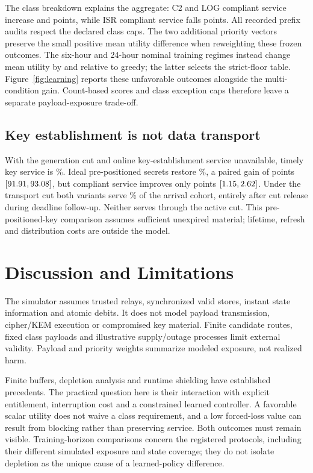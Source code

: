 \documentclass[conference,a4paper]{IEEEtran}
\begin{document}
The class breakdown explains the aggregate: C2 and LOG compliant service increase \LearnCommandDelta{} and \LearnLogisticsDelta{} points, while ISR compliant service falls \LearnISRLoss{} points. All recorded prefix audits respect the declared class caps. The two additional priority vectors preserve the small positive mean utility difference when reweighting these frozen outcomes. The six-hour and 24-hour nominal training regimes instead change mean utility by \LearnShortDelta{} and \LearnLongDelta{} relative to greedy; the latter selects the strict-floor table. Figure~\ref{fig:learning} reports these unfavorable outcomes alongside the multi-condition gain. Count-based scores and class exception caps therefore leave a separate payload-exposure trade-off.

\subsection{Key establishment is not data transport}\label{sec:fallback}
With the generation cut and online key-establishment service unavailable, timely key service is \FallbackOnline\%. Ideal pre-positioned secrets restore \FallbackPreplaced\%, a paired gain of \FallbackServiceGain{} points $[91.91,93.08]$, but compliant service improves only \FallbackQualifiedGain{} points $[1.15,2.62]$. Under the transport cut both variants serve \FallbackTransport\% of the arrival cohort, entirely after cut release during deadline follow-up. Neither serves through the active cut. This pre-positioned-key comparison assumes sufficient unexpired material; lifetime, refresh and distribution costs are outside the model.

\section{Discussion and Limitations}\label{sec:limits}
The simulator assumes trusted relays, synchronized valid stores, instant state information and atomic debits. It does not model payload transmission, cipher/KEM execution or compromised key material. Finite candidate routes, fixed class payloads and illustrative supply/outage processes limit external validity. Payload and priority weights summarize modeled exposure, not realized harm.

Finite buffers, depletion analysis and runtime shielding have established precedents. The practical question here is their interaction with explicit entitlement, interruption cost and a constrained learned controller. A favorable scalar utility does not waive a class requirement, and a low forced-loss value can result from blocking rather than preserving service. Both outcomes must remain visible. Training-horizon comparisons concern the registered protocols, including their different simulated exposure and state coverage; they do not isolate depletion as the unique cause of a learned-policy difference.
\end{document}
